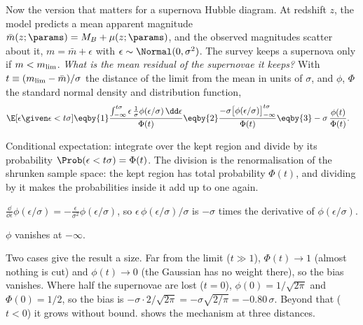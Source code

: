 Now the version that matters for a supernova Hubble diagram. At redshift $z$, the model predicts a mean apparent magnitude $\bar m(z;\params)=M_B+\mu(z;\params)$, and the observed magnitudes scatter about it, $m=\bar m+\epsilon$ with $\epsilon\sim\Normal(0,\sigma^2)$. The survey keeps a supernova only if $m<m_{\rm lim}$. \emph{What is the mean residual of the supernovae it keeps?} With $t\equiv(m_{\rm lim}-\bar m)/\sigma$ the distance of the limit from the mean in units of $\sigma$, and $\phi$, $\Phi$ the standard normal density and distribution function,
\begin{align}
  \E[\epsilon\given\epsilon<t\sigma]
  &\eqby{1}\frac{\int_{-\infty}^{t\sigma}\epsilon\,\frac1\sigma\phi(\epsilon/\sigma)\,\dd\epsilon}{\Phi(t)}
  \eqby{2}\frac{-\sigma\big[\phi(\epsilon/\sigma)\big]_{-\infty}^{t\sigma}}{\Phi(t)}
  \eqby{3}-\sigma\,\frac{\phi(t)}{\Phi(t)} .
  \label{T2b:eq:trunc-mean}
\end{align}
\begin{explain}
  \item Conditional expectation: integrate over the kept region and divide by its probability $\Prob(\epsilon<t\sigma)=\Phi(t)$. The division is the renormalisation of the shrunken sample space: the kept region has total probability $\Phi(t)$, and dividing by it makes the probabilities inside it add up to one again.
  \item $\frac{\dd}{\dd\epsilon}\phi(\epsilon/\sigma)=-\frac{\epsilon}{\sigma^2}\phi(\epsilon/\sigma)$, so $\epsilon\,\phi(\epsilon/\sigma)/\sigma$ is $-\sigma$ times the derivative of $\phi(\epsilon/\sigma)$.
  \item $\phi$ vanishes at $-\infty$.
\end{explain}
Two cases give the result a size. Far from the limit ($t\gg1$), $\Phi(t)\to1$ (almost nothing is cut) and $\phi(t)\to0$ (the Gaussian has no weight there), so the bias vanishes. Where half the supernovae are lost ($t=0$), $\phi(0)=1/\sqrt{2\pi}$ and $\Phi(0)=1/2$, so the bias is $-\sigma\cdot2/\sqrt{2\pi}=-\sigma\sqrt{2/\pi}=-0.80\,\sigma$. Beyond that ($t<0$) it grows without bound.  shows the mechanism at three distances.

